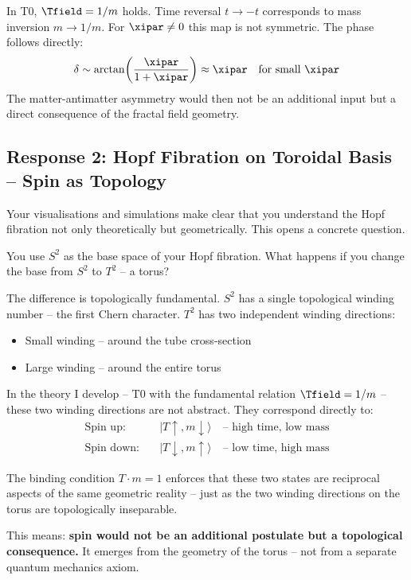 In T0, $\Tfield = 1/m$ holds. Time reversal $t \to -t$ corresponds to mass inversion $m \to 1/m$. For $\xipar \neq 0$ this map is not symmetric. The phase follows directly:
\begin{equation}
  \delta \sim \arctan\!\left(\frac{\xipar}{1+\xipar}\right) \approx \xipar \quad \text{for small } \xipar
\end{equation}
The matter-antimatter asymmetry would then not be an additional input but a direct consequence of the fractal field geometry.

\subsection{Response 2: Hopf Fibration on Toroidal Basis -- Spin as Topology}

\begin{response}
Your visualisations and simulations make clear that you understand the Hopf fibration not only theoretically but geometrically. This opens a concrete question.

You use $S^2$ as the base space of your Hopf fibration. What happens if you change the base from $S^2$ to $T^2$ -- a torus?

The difference is topologically fundamental. $S^2$ has a single topological winding number -- the first Chern character. $T^2$ has two independent winding directions:
\begin{itemize}[noitemsep]
  \item Small winding -- around the tube cross-section
  \item Large winding -- around the entire torus
\end{itemize}

In the theory I develop -- T0 with the fundamental relation $\Tfield = 1/m$ -- these two winding directions are not abstract. They correspond directly to:
\begin{align}
  \text{Spin up:} \quad &|T{\uparrow}, m{\downarrow}\rangle \quad \text{-- high time, low mass} \\
  \text{Spin down:} \quad &|T{\downarrow}, m{\uparrow}\rangle \quad \text{-- low time, high mass}
\end{align}

The binding condition $T \cdot m = 1$ enforces that these two states are reciprocal aspects of the same geometric reality -- just as the two winding directions on the torus are topologically inseparable.

\medskip
This means: \textbf{spin would not be an additional postulate but a topological consequence.} It emerges from the geometry of the torus -- not from a separate quantum mechanics axiom.


\end{response}
